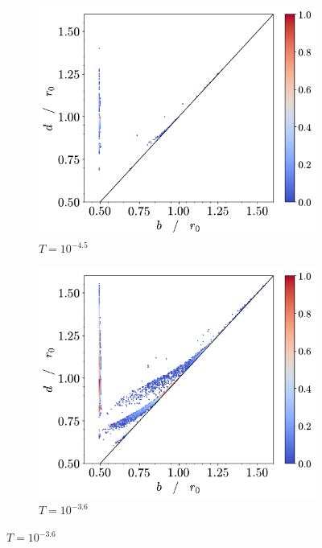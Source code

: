 \begin{figure}[tb]
	\centering
     
      \begin{subfigure}[b]{0.48\textwidth}
         \centering
         \includegraphics[width=\textwidth]{./figures/ph/t-4500_tr_pd.pdf}
         \caption{$T=10^{-4.5}$}
         \label{fig:trpda}
     \end{subfigure}
     \hfill
      \begin{subfigure}[b]{0.48\textwidth}
         \centering
         \includegraphics[width=\textwidth]{./figures/ph/t-3600_tr_pd.pdf}
         \caption{$T=10^{-3.6}$}
         \label{fig:trpdb}
     \end{subfigure}
     \hfill
     	

\end{figure}
